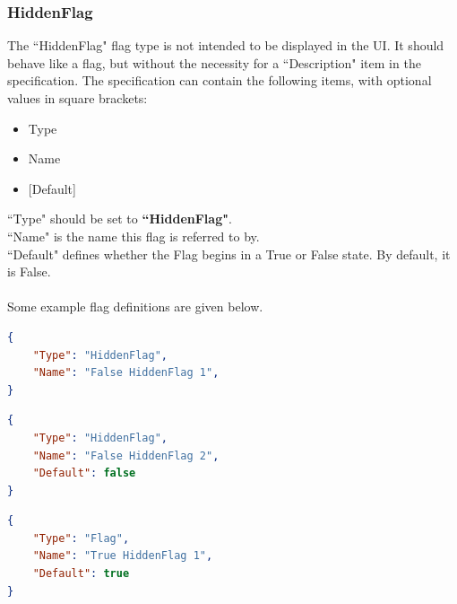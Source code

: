 \documentclass{article}
\begin{document}
\subsubsection{HiddenFlag}
The ``HiddenFlag" flag type is not intended to be displayed in the UI. It should behave like a flag, but without the necessity for a ``Description" item in the specification. The specification can contain the following items, with optional values in square brackets:
\begin{itemize}
\item Type
\item Name
\item {[Default]}
\end{itemize}
``Type" should be set to \textbf{``HiddenFlag"}.\\
``Name" is the name this flag is referred to by.\\
``Default" defines whether the Flag begins in a True or False state. By default, it is False.\\\\
Some example flag definitions are given below.
\begin{lstlisting}[language=json,firstnumber=1]
{
    "Type": "HiddenFlag",
    "Name": "False HiddenFlag 1",
}
\end{lstlisting}
\begin{lstlisting}[language=json,firstnumber=1]
{
    "Type": "HiddenFlag",
    "Name": "False HiddenFlag 2",
    "Default": false
}
\end{lstlisting}

\begin{lstlisting}[language=json,firstnumber=1]
{
    "Type": "Flag",
    "Name": "True HiddenFlag 1",
    "Default": true
}
\end{lstlisting}
\end{document}
